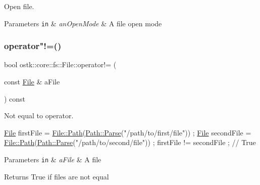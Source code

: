 Open file. 


\begin{DoxyParams}[1]{Parameters}
\mbox{\tt in}  & {\em an\+Open\+Mode} & A file open mode \\
\hline
\end{DoxyParams}
\mbox{\label{classostk_1_1core_1_1fs_1_1_file_a96e2f605d1599c6c7368037917ababa9}} 
\subsubsection{\texorpdfstring{operator"!=()}{operator!=()}}
{\footnotesize\ttfamily bool ostk\+::core\+::fs\+::\+File\+::operator!= (\begin{DoxyParamCaption}\item[{const \hyperlink{classostk_1_1core_1_1fs_1_1_file}{File} \&}]{a\+File }\end{DoxyParamCaption}) const}



Not equal to operator. 


\begin{DoxyCode}
\hyperlink{classostk_1_1core_1_1fs_1_1_file_ad1695224996950be9962b8457da369b3}{File} firstFile = \hyperlink{classostk_1_1core_1_1fs_1_1_file_ad677c6a3edc1e88c18226edebff1da03}{File::Path}(\hyperlink{classostk_1_1core_1_1fs_1_1_path_ad08539ba654f5df11c4bcb07276345ad}{Path::Parse}(\textcolor{stringliteral}{"/path/to/first/file"})) ;
\hyperlink{classostk_1_1core_1_1fs_1_1_file_ad1695224996950be9962b8457da369b3}{File} secondFile = \hyperlink{classostk_1_1core_1_1fs_1_1_file_ad677c6a3edc1e88c18226edebff1da03}{File::Path}(\hyperlink{classostk_1_1core_1_1fs_1_1_path_ad08539ba654f5df11c4bcb07276345ad}{Path::Parse}(\textcolor{stringliteral}{"/path/to/second/file"})) ;
firstFile != secondFile ; \textcolor{comment}{// True}
\end{DoxyCode}



\begin{DoxyParams}[1]{Parameters}
\mbox{\tt in}  & {\em a\+File} & A file \\
\hline
\end{DoxyParams}
\begin{DoxyReturn}{Returns}
True if files are not equal 
\end{DoxyReturn}
\mbox{\label{classostk_1_1core_1_1fs_1_1_file_a2521124159897934f1a85144511043f7}} 
